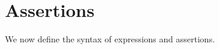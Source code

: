 
\section{ Assertions}
\label{sect:assertions}

We now define the syntax of  expressions and assertions.
%
%
%
%
%
